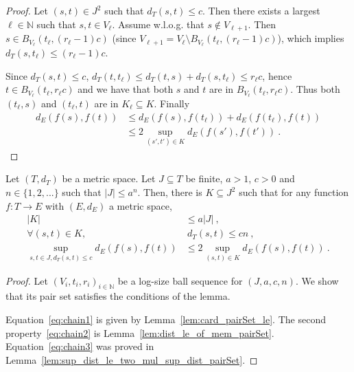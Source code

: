 \begin{proof}
\leanok
Let $(s, t) \in J^2$ such that $d_T(s, t) \le c$.
Then there exists a largest $\ell \in \mathbb{N}$ such that $s, t \in V_\ell$.
Assume w.l.o.g. that $s \notin V_{\ell + 1}$. Then $s \in B_{V_\ell}(t_\ell, (r_\ell-1)c)$ (since $V_{\ell + 1} = V_\ell \setminus B_{V_\ell}(t_\ell, (r_\ell-1)c)$), which implies $d_T(s, t_\ell) \le (r_\ell - 1)c$.

Since $d_T(s, t) \le c$, $d_T(t, t_\ell) \le d_T(t, s) + d_T(s, t_\ell) \le r_\ell c$, hence $t \in B_{V_\ell}(t_\ell, r_\ell c)$ and we have that both $s$ and $t$ are in $B_{V_\ell}(t_\ell, r_\ell c)$.
Thus both $(t_\ell, s)$ and $(t_\ell, t)$ are in $K_\ell \subseteq K$.
Finally
\begin{align*}
  d_E(f(s), f(t))
  &\le d_E(f(s), f(t_\ell)) + d_E(f(t_\ell), f(t))
  \\
  &\le 2\sup_{(s',t') \in K} d_E(f(s'), f(t'))
  \: .
\end{align*}
\end{proof}


\begin{lemma}\label{lem:pair_reduction}
  \leanok
Let $(T,d_T)$ be a metric space.
Let $J \subseteq T$ be finite, $a > 1$, $c>0$ and $n \in \{1, 2, ...\}$ such that $|J| \le a^n$.
Then, there is $K \subseteq J^2$ such that for any function $f : T \to E$ with $(E,d_E)$ a metric space,
\begin{align}
  |K|
  & \le a |J|
  \:, \label{eq:chain1} \\
  \forall (s,t) \in K,
  &\:  d_T(s,t) \le c n
  \:, \label{eq:chain2} \\
  \sup_{s,t\in J, d_T(s,t) \le c} d_E(f(s), f(t))
  & \le 2 \sup_{(s,t) \in K} d_E(f(s), f(t))
  \: . \label{eq:chain3}
\end{align}
\end{lemma}

\begin{proof}\leanok
Let $(V_i, t_i, r_i)_{i \in \mathbb{N}}$ be a log-size ball sequence for $(J, a, c, n)$. We show that its pair set satisfies the conditions of the lemma.

Equation~\eqref{eq:chain1} is given by Lemma~\ref{lem:card_pairSet_le}.
The second property~\eqref{eq:chain2} is Lemma~\ref{lem:dist_le_of_mem_pairSet}.
Equation~\eqref{eq:chain3} was proved in Lemma~\ref{lem:sup_dist_le_two_mul_sup_dist_pairSet}.
\end{proof}






